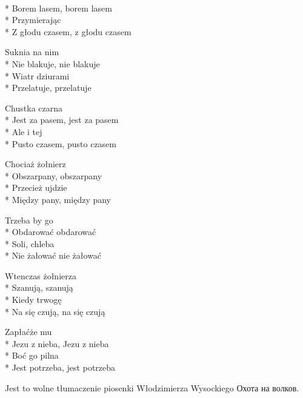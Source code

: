 \begin{lyrics}[longestline={Z głodu czasem, z głodu czasem}]

\\*
Borem lasem, borem lasem\\*
Przymierając\\*
Z głodu czasem, z głodu czasem

Suknia na nim\\*
Nie blakuje, nie blakuje\\*
Wiatr dziurami\\*
Przelatuje, przelatuje

Chustka czarna\\*
Jest za pasem, jest za pasem\\*
Ale i tej\\*
Pusto czasem, pusto czasem

Chociaż żołnierz\\*
Obszarpany, obszarpany\\*
Przecież ujdzie\\*
Między pany, między pany

Trzeba by go\\*
Obdarować obdarować\\*
Soli, chleba\\*
Nie żałować nie żałować

Wtenczas żołnierza\\*
Szanują, szanują\\*
Kiedy trwogę\\*
Na się czują, na się czują

Zapłaćże mu\\*
Jezu z nieba, Jezu z nieba\\*
Boć go pilna\\*
Jest potrzeba, jest potrzeba
\end{lyrics}



\begin{info} Jest to wolne tłumaczenie piosenki Włodzimierza Wysockiego Охота на волков.\end{info}

